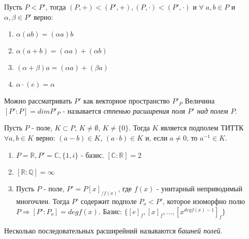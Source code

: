 \begin{defs}
  Пусть $P < P'$, тогда $(P, +) < (P', +), (P, \cdot) < (P', \cdot)$ и $\forall\; a,b \in P$ и $\alpha,\beta \in P'$ верно:
  \begin{enumerate}
    \item $\alpha(ab) = (\alpha a)b$
    \item $\alpha(a+b) = (\alpha a) + (\alpha b)$
    \item $(\alpha+\beta)a = (\alpha a) + (\beta a)$
    \item $\alpha\cdot(e) = \alpha$
  \end{enumerate}
  Можно рассматривать $P'$ как векторное пространство $P'_{P}$
  Величина $[P':P] = dimP'_{P}$ - называется \textit{стпенью расширения поля $P'$ над полем $P$}.
\end{defs}

\begin{proofs}
	Пусть $P$ - поле, $K \subset P$, $K \neq \emptyset$, $K \neq \{0\}$. Тогда $K$ является подполем ТИТТК $\forall a,b \in K$ верно: $(a - b) \in K$, $(a \cdot b) \in K$ и, если $a \neq 0$, то $a^{-1} \in K$.
\end{proofs}

\begin{example}
  \begin{enumerate}
    \item $P = \mathbb{R}, P' = \mathbb{C}, \{1,i\}$ - базис. $[\mathbb{C}:\mathbb{R}] = 2$
    \item $[\mathbb{R}:\mathbb{Q}] = \infty$
    \item Пусть $P$ - поле, $P' = P[x]_{/f(x)}$, где $f(x)$ - унитарный неприводимый многочлен. Тогда $P'$ содержит подполе $P_{o} < P'$,
    которое изоморфно полю $P \Rightarrow [P':P_{o}] = degf(x)$. Базис: $\{[e]_{f}, [x]_{f}, ... , [x^{degf(x)-1}]_{f}\}$
  \end{enumerate}
\end{example}

\begin{defs}
  Несколько последовательных расширейний называются \textit{башней полей}.
\end{defs}

